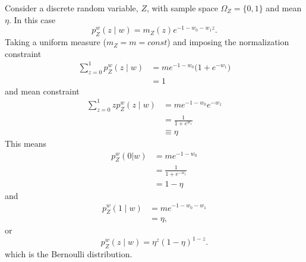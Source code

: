 \begin{example}
	Consider a discrete random variable, $Z$, with sample space $\Omega_Z= \{0,1\}$ and mean $\eta$. In this case
	\begin{equation}
		p_{Z}^w(z \mid w) = m_Z(z) e^{-1-w_0 - w_1 z}.
	\end{equation}
	Taking a uniform measure ($m_Z = m= const$) and imposing the normalization constraint
	\begin{equation}
		\begin{split}
			\sum_{z=0}^1 p_{Z}^w(z\mid w) &=m e^{-1-w_0}\bigg(1+ e^{- w_1}\bigg)\\
			&=1
		\end{split}
	\end{equation}
	and mean constraint
	\begin{equation}
		\begin{split}
			\sum_{z=0}^1 zp_{Z}^w(z \mid w) &=m e^{-1-w_0}e^{- w_1}\\
			& = \frac{1}{1+ e^{w_1}}\\
			&\equiv \eta
		\end{split}
	\end{equation}
	This means
	\begin{equation}
		\begin{split}
			p_{Z}^w(0|w) &= m e^{-1-w_0}\\
			&= \frac{1}{1+ e^{- w_1}}\\
			& = 1-\eta
		\end{split}
	\end{equation}	
	and
	\begin{equation}
		\begin{split}
			p_{Z}^w(1\mid w) &= m e^{-1-w_0-w_1}\\
			&=\eta,
		\end{split}
	\end{equation}
	or 
	\begin{equation}
		p_{Z}^w(z\mid w) = \eta^z (1-\eta)^{1-z}.
	\end{equation}
	which is the Bernoulli distribution.
\end{example}

